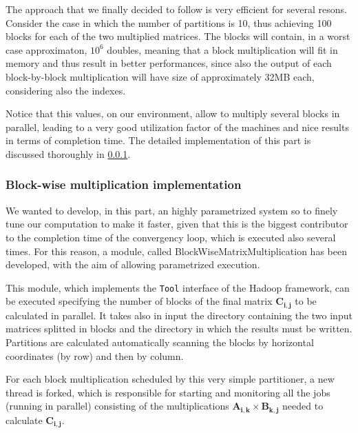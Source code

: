 The approach that we finally decided to follow is very efficient for several resons.
Consider the case in which the number of partitions is 10, thus achieving 100 blocks for each of the two multiplied matrices.
The blocks will contain, in a worst case approximaton, $10^6$ doubles, meaning that a block multiplication will fit in memory and thus result in better performances, since also the output of each block-by-block multiplication will have size of approximately 32MB each, considering also the indexes.

Notice that this values, on our environment, allow to multiply several blocks in parallel, leading to a very good utilization
factor of the machines and nice results in terms of completion time.
The detailed implementation of this part is discussed thoroughly in \ref{blockmul}.

\subsubsection{Block-wise multiplication implementation}
\label{blockmul}
We wanted to develop, in this part, an highly parametrized system so to finely tune our computation to make it faster,
given that this is the biggest contributor to the completion time of the convergency loop, which is executed also several times.
For this reason, a module, called BlockWiseMatrixMultiplication has been developed, with the aim of allowing parametrized execution.

This module, which implements the \texttt{Tool} interface of the Hadoop framework, can be executed specifying the number
of blocks of the final matrix $\mathbf{C_{i,j}}$ to be calculated in parallel. It takes also in input the directory containing
the two input matrices splitted in blocks and the directory in which the results must be written. 
Partitions are calculated automatically scanning the blocks by horizontal coordinates (by row) and then by column.

For each block multiplication scheduled by this very simple partitioner, a new thread is forked, which is responsible
for starting and monitoring all the jobs (running in parallel) consisting of the multiplications $\mathbf{A_{i,k}} \times \mathbf{B_{k,j}}$ needed to calculate $\mathbf{C_{i,j}}$.

